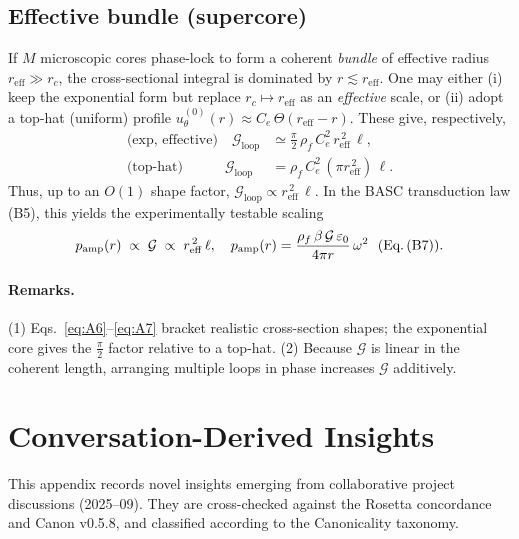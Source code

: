 \subsection*{Effective bundle (supercore)}
If $M$ microscopic cores phase-lock to form a coherent \emph{bundle} of effective radius $r_{\mathrm{eff}}\gg r_c$, the cross-sectional integral is dominated by $r\lesssim r_{\mathrm{eff}}$. One may either (i) keep the exponential form but replace $r_c\mapsto r_{\mathrm{eff}}$ as an \emph{effective} scale, or (ii) adopt a top-hat (uniform) profile $u_\theta^{(0)}(r)\approx C_e\,\Theta(r_{\mathrm{eff}}-r)$. These give, respectively,
\begin{align}
    \text{(exp, effective)}\quad
    \mathcal{G}_{\text{loop}}
    &\simeq \frac{\pi}{2}\,\rho_f\,C_e^2\,r_{\mathrm{eff}}^{\,2}\,\ell,
    \label{eq:A6}\\
    \text{(top-hat)}\qquad\quad
    \mathcal{G}_{\text{loop}}
    &= \rho_f\,C_e^2\,(\pi r_{\mathrm{eff}}^{\,2})\,\ell.
    \label{eq:A7}
\end{align}
Thus, up to an $O(1)$ shape factor, \emph{$\mathcal{G}_{\text{loop}}\propto r_{\mathrm{eff}}^{\,2}\,\ell$}. In the BASC transduction law (B5), this yields the experimentally testable scaling
\begin{equation}
    p_{\mathrm{amp}}(r)\;\propto\;\mathcal{G}\;\propto\;r_{\mathrm{eff}}^{\,2}\,\ell,
    \quad
    p_{\mathrm{amp}}(r)=\frac{\rho_f\,\beta\,\mathcal{G}\,\varepsilon_0}{4\pi r}\,\omega^2
    \ \ \text{(Eq.\,(B7))}.
    \label{eq:A8}
\end{equation}

\paragraph{Remarks.}
(1) Eqs.~\eqref{eq:A6}–\eqref{eq:A7} bracket realistic cross-section shapes; the exponential core gives the $\tfrac{\pi}{2}$ factor relative to a top-hat. (2) Because $\mathcal{G}$ is linear in the coherent length, arranging multiple loops in phase increases $\mathcal{G}$ additively.

\section{Conversation-Derived Insights}
\label{app:conv_insights}

This appendix records novel insights emerging from collaborative project discussions
(2025–09). They are cross-checked against the Rosetta concordance and Canon v0.5.8,
and classified according to the Canonicality taxonomy.

